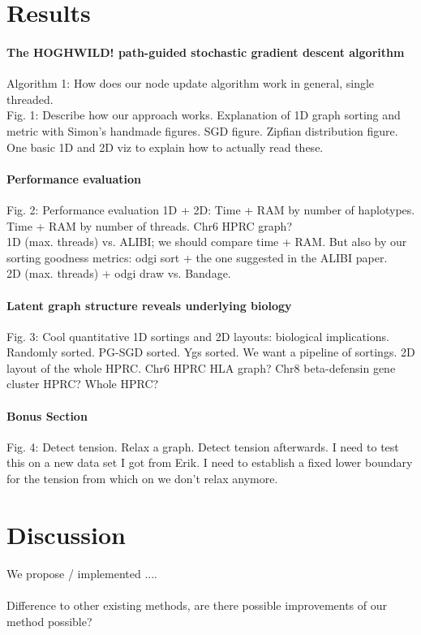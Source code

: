 \documentclass[11pt,hidelinks]{article}
\begin{document}
\section{Results}

\paragraph{The HOGHWILD! path-guided stochastic gradient descent algorithm}
Algorithm 1: How does our node update algorithm work in general, single threaded.
\\
Fig. 1: Describe how our approach works. Explanation of 1D graph sorting and metric with Simon's handmade figures. SGD figure. Zipfian distribution figure. One basic 1D and 2D viz to explain how to actually read these.
\paragraph{Performance evaluation}
Fig. 2: Performance evaluation 1D + 2D: Time + RAM by number of haplotypes. Time + RAM by number of threads. Chr6 HPRC graph?
\\
1D (max. threads) vs. ALIBI; we should compare time + RAM. But also by our sorting goodness metrics: odgi sort + the one suggested in the ALIBI paper. 
\\
2D (max. threads) + odgi draw vs. Bandage.
\paragraph{Latent graph structure reveals underlying biology}
Fig. 3: Cool quantitative 1D sortings and 2D layouts: biological implications. Randomly sorted. PG-SGD sorted. Ygs sorted. We want a pipeline of sortings. 2D layout of the whole HPRC. Chr6 HPRC HLA graph? Chr8 beta-defensin gene cluster HPRC? Whole HPRC?
\paragraph{Bonus Section}
Fig. 4: Detect tension. Relax a graph. Detect tension afterwards. I need to test this on a new data set I got from Erik. I need to establish a fixed lower boundary for the tension from which on we don't relax anymore.

\section{Discussion}

We propose / implemented ....
\paragraph{}
Difference to other existing methods, are there possible improvements of our method possible?
\end{document}
